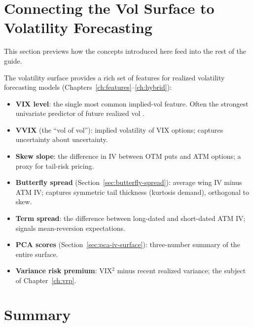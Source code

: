 \section{Connecting the Vol Surface to Volatility Forecasting}
\label{sec:surface-to-forecasting}

This section previews how the concepts introduced here feed into the rest of the guide.

\begin{keyidea}
The volatility surface provides a rich set of features for realized volatility forecasting models (Chapters~\ref{ch:features}--\ref{ch:hybrid}):
\begin{itemize}[nosep]
  \item \textbf{VIX level}: the single most common implied-vol feature. Often the strongest univariate predictor of future realized vol \citep{Gu2020}.
  \item \textbf{VVIX} (the ``vol of vol''): implied volatility of VIX options; captures uncertainty about uncertainty.
  \item \textbf{Skew slope}: the difference in IV between OTM puts and ATM options; a proxy for tail-risk pricing.
  \item \textbf{Butterfly spread} (Section~\ref{sec:butterfly-spread}): average wing IV minus ATM IV; captures symmetric tail thickness (kurtosis demand), orthogonal to skew.
  \item \textbf{Term spread}: the difference between long-dated and short-dated ATM IV; signals mean-reversion expectations.
  \item \textbf{PCA scores} (Section~\ref{sec:pca-iv-surface}): three-number summary of the entire surface.
  \item \textbf{Variance risk premium}: VIX$^2$ minus recent realized variance; the subject of Chapter~\ref{ch:vrp}.
\end{itemize}
\end{keyidea}


\section{Summary}
\label{sec:volsurface-summary}

